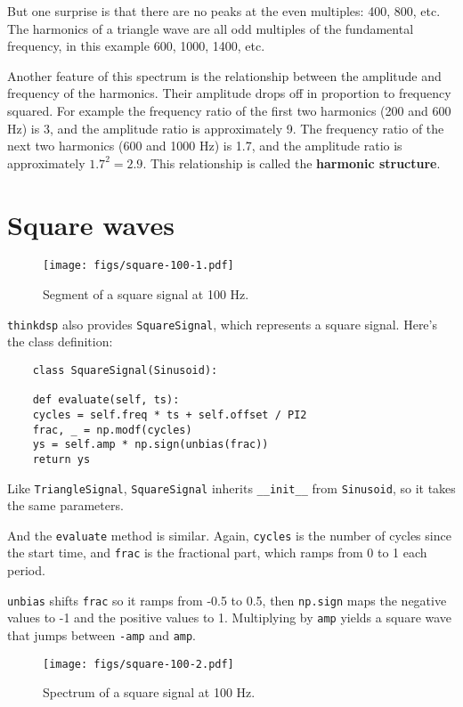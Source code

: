 But one surprise is that there are no peaks at the even multiples:
400, 800, etc.  The harmonics of a triangle wave are all
odd multiples of the fundamental frequency, in this example
600, 1000, 1400, etc.

Another feature of this spectrum is the relationship between the
amplitude and frequency of the harmonics.  Their amplitude drops off
in proportion to frequency squared.  For example the frequency ratio
of the first two harmonics (200 and 600 Hz) is 3, and the amplitude
ratio is approximately 9.  The frequency ratio of the next two
harmonics (600 and 1000 Hz) is 1.7, and the amplitude ratio is
approximately $1.7^2 = 2.9$.  This relationship is called the
{\bf harmonic structure}.


\section{Square waves}
\label{square}

\begin{figure}
	\centerline{\texttt{[image: figs/square-100-1.pdf]}}
	\caption{Segment of a square signal at 100 Hz.}
	\label{fig.square.100.1}
\end{figure}

{\tt thinkdsp} also provides {\tt SquareSignal}, which represents
a square signal.  Here's the class definition:

\begin{verbatim}
	class SquareSignal(Sinusoid):
	
	def evaluate(self, ts):
	cycles = self.freq * ts + self.offset / PI2
	frac, _ = np.modf(cycles)
	ys = self.amp * np.sign(unbias(frac))
	return ys
\end{verbatim}

Like {\tt TriangleSignal}, {\tt SquareSignal} inherits
\verb"__init__" from {\tt Sinusoid}, so it takes the same
parameters.

And the {\tt evaluate} method is similar.  Again, {\tt cycles} is
the number of cycles since the start time, and {\tt frac} is the
fractional part, which ramps from 0 to 1 each period.

{\tt unbias} shifts {\tt frac} so it ramps from -0.5 to 0.5,
then {\tt np.sign} maps the negative values to -1 and the
positive values to 1.  Multiplying by {\tt amp} yields a square
wave that jumps between {\tt -amp} and {\tt amp}.

\begin{figure}
	\centerline{\texttt{[image: figs/square-100-2.pdf]}}
	\caption{Spectrum of a square signal at 100 Hz.}
	\label{fig.square.100.2}
\end{figure}

